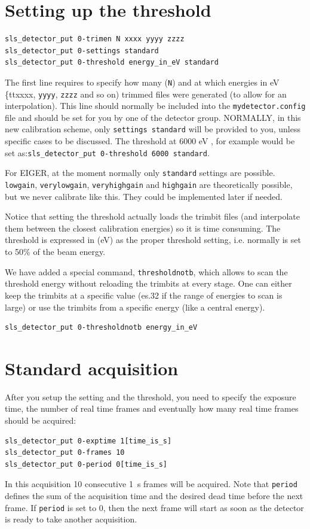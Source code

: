 \documentclass{article}
\newcommand{\E}{EIGER\xspace}
\begin{document}
\section{Setting up the threshold}
\begin{verbatim}
sls_detector_put 0-trimen N xxxx yyyy zzzz
sls_detector_put 0-settings standard 
sls_detector_put 0-threshold energy_in_eV standard
\end{verbatim}
The first line requires to specify how many ({\tt{N}}) and at which energies in eV {\{tt{xxxx}}, {\tt{yyyy}}, {\tt{zzzz}} and so on) trimmed files were generated (to allow for an interpolation). This line should normally be included into the {\tt{mydetector.config}} file and should be set for you by one of the detector group.
NORMALLY, in this new calibration scheme, only {\tt{settings standard}} will be provided to you, unless specific cases to be discussed.
The threshold at 6000 eV , for example would be set as:{\tt{sls\_detector\_put 0-threshold 6000 standard}}.

For \E, at the moment normally only {\tt{standard}} settings are possible.
 {\tt{lowgain}}, {\tt{verylowgain}}, {\tt{veryhighgain}} and {\tt{highgain}} are theoretically possible, but we never calibrate like this. They could be implemented later if needed. 

Notice that setting the threshold actually loads the trimbit files (and interpolate them between the closest calibration energies) so it is time consuming. 
The threshold is expressed in (eV) as the proper threshold setting, i.e. normally is set to 50\% of the beam energy.  

We have added a special command, {\tt{thresholdnotb}}, which allows to scan the threshold energy without reloading the trimbits at every stage. One can either keep the trimbits at a specific value (es.32 if the range of energies to scan is large) or use the trimbits from a specific energy (like a central energy).
\begin{verbatim}
sls_detector_put 0-thresholdnotb energy_in_eV
\end{verbatim}

\section{Standard acquisition}

After you setup the setting and the threshold, you need to specify the exposure time, the number of real time frames and eventually how many real time frames should be acquired:
\begin{verbatim}
sls_detector_put 0-exptime 1[time_is_s]
sls_detector_put 0-frames 10
sls_detector_put 0-period 0[time_is_s]
\end{verbatim}
In this acquisition 10 consecutive 1~s frames will be acquired. Note that {\tt{period}} defines the sum of the acquisition time and the desired dead time before the next frame. If {\tt{period}} is set to 0, then the next frame will start as soon as the detector is ready to take another acquisition. \\
\end{document}
